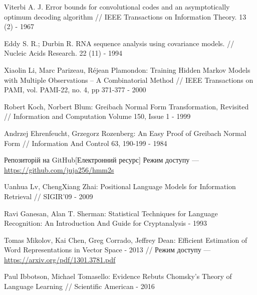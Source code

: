 \begin{thebibliography}
    Viterbi A. J. Error bounds for convolutional codes and an asymptotically optimum decoding algorithm // IEEE Transactions on Information Theory. 13 (2) - 1967

    Eddy S. R.; Durbin R. RNA sequence analysis using covariance models. // Nucleic Acids Research. 22 (11) - 1994

    Xiaolin Li, Marc Parizeau, Réjean Plamondon: Training Hidden Markov Models with Multiple Observations – A Combinatorial Method // IEEE Transactions on PAMI, vol. PAMI-22, no. 4, pp 371-377 - 2000

    Robert Koch, Norbert Blum: Greibach Normal Form Transformation, Revisited // Information and Computation Volume 150, Issue 1 - 1999

    Andrzej Ehrenfeucht, Grzegorz Rozenberg: An Easy Proof of Greibach Normal Form // Information And Control 63, 190-199 - 1984

    Репозиторій на GitHub[Електронний ресурс] Режим доступу --- \url{https://github.com/juja256/hmm2s}

    Uanhua Lv, ChengXiang Zhai: Positional Language Models for Information Retrieval // SIGIR’09 - 2009

    Ravi Ganesan, Alan T. Sherman: Statistical Techniques for Language Recognition: An Introduction And Guide for Cryptanalysis - 1993

    Tomas Mikolov, Kai Chen, Greg Corrado, Jeffrey Dean: Efficient Estimation of Word Representations in Vector Space - 2013 // Режим доступу --- \url{https://arxiv.org/pdf/1301.3781.pdf}

    Paul Ibbotson, Michael Tomasello: Evidence Rebuts Chomsky's Theory of Language Learning // Scientific American - 2016
\end{thebibliography}
